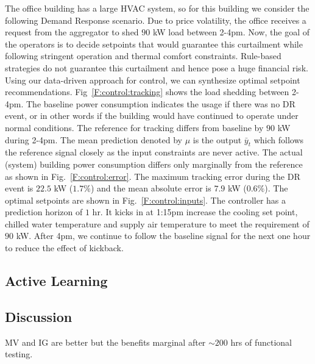 The office building has a large HVAC system, so for this building we consider the following Demand Response scenario. 
Due to price volatility, the office receives a request from the aggregator to shed \(90\) kW load between 2-4pm. 
Now, the goal of the operators is to decide setpoints that would guarantee this curtailment while following stringent operation and thermal comfort constraints. 
Rule-based strategies do not guarantee this curtailment and hence pose a huge financial risk. 
Using our data-driven approach for control, we can synthesize optimal setpoint recommendations.
Fig~\ref{F:control:tracking} shows the load shedding between 2-4pm. 
The baseline power consumption indicates the usage if there was no DR event, or in other words if the building would have continued to operate under normal conditions. The reference for tracking differs from baseline by \(90\) kW during 2-4pm.
The mean prediction denoted by \(\mu\) is the output \(\bar{y}_{t}\) which follows the reference signal closely as the input constraints are never active. The actual (system) building power consumption differs only marginally from the reference as shown in Fig.~\ref{F:control:error}. The maximum tracking error during the DR event is \(22.5\) kW (\(1.7\%\)) and the mean absolute error is \(7.9\) kW (\(0.6\%\)). The optimal setpoints are shown in Fig.~\ref{F:control:inputs}. The controller has a prediction horizon of \(1\) hr. It kicks in at 1:15pm increase the cooling set point, chilled water temperature and supply air temperature to meet the requirement of \(90\) kW. After 4pm, we continue to follow the baseline signal for the next one hour to reduce the effect of kickback.

\subsection{Active Learning}
\label{SS:casestudy:active}

\subsection{Discussion}

MV and IG are better but the benefits marginal after \(\sim200\) hrs of functional testing.



